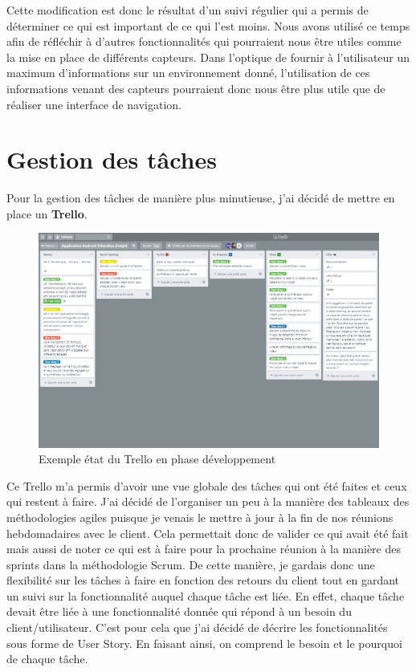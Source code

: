\documentclass[UTF8]{EPURapport}
\begin{document}
Cette modification est donc le résultat d'un suivi régulier qui a permis de déterminer ce qui est important de ce qui l'est moins. Nous avons utilisé ce temps afin de réfléchir à d'autres fonctionnalités qui pourraient nous être utiles comme la mise en place de différents capteurs. Dans l'optique de fournir à l'utilisateur un maximum d'informations sur un environnement donné, l'utilisation de ces informations venant des capteurs pourraient donc nous être plus utile que de réaliser une interface de navigation. 

\section{Gestion des tâches}

Pour la gestion des tâches de manière plus minutieuse, j'ai décidé de mettre en place un \textbf{Trello}. \\
\newpage

\begin{figure}[h!]
\centering
  \includegraphics[width=\textwidth]{images/Trello1.JPG}
  \caption{Exemple état du Trello en phase développement}
  \label{fig:trello}
\end{figure}

Ce Trello m'a permis d'avoir une vue globale des tâches qui ont été faites et ceux qui restent à faire. J'ai décidé de l'organiser un peu à la manière des tableaux des méthodologies agiles puisque je venais le mettre à jour à la fin de nos réunions hebdomadaires avec le client. Cela permettait donc de valider ce qui avait été fait mais aussi de noter ce qui est à faire pour la prochaine réunion à la manière des sprints dans la méthodologie Scrum. De cette manière, je gardais donc une flexibilité sur les tâches à faire en fonction des retours du client tout en gardant un suivi sur la fonctionnalité auquel chaque tâche est liée. En effet, chaque tâche devait être liée à une fonctionnalité donnée qui répond à un besoin du client/utilisateur. C'est pour cela que j'ai décidé de décrire les fonctionnalités sous forme de User Story. En faisant ainsi, on comprend le besoin et le pourquoi de chaque tâche.\\
\end{document}

